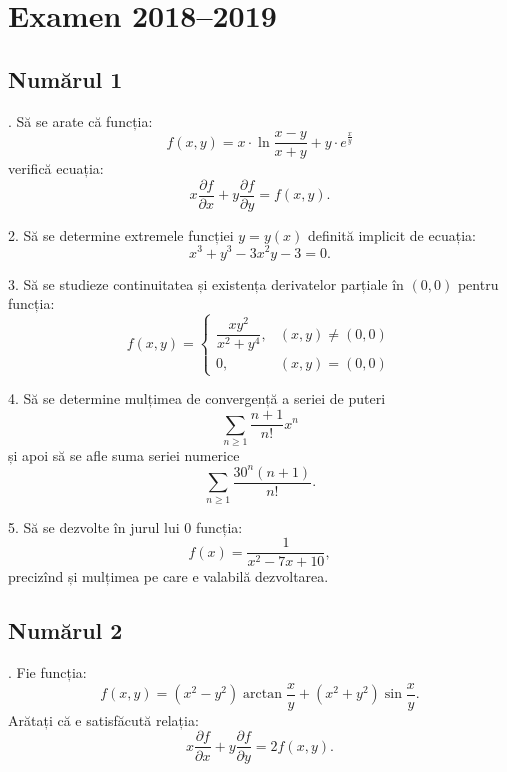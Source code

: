 
\chapter{Examen 2018--2019}

\section{Numărul 1}

\indent{}. Să se arate că funcția:
\[
  f(x, y) = x \cdot \ln \frac{x - y}{x + y} + y\cdot e^{\frac{x}{y}}
\]
verifică ecuația:
\[
  x \frac{\partial f}{\partial x} + y \frac{\partial f}{\partial y} = f(x, y).
\]

\vspace{1cm}

2. Să se determine extremele funcției $ y = y(x) $ definită implicit de
ecuația:
\[
    x^3 + y^3 - 3x^2y - 3 = 0.
\]

\vspace{1cm}

3. Să se studieze continuitatea și existența derivatelor parțiale în $(0, 0) $
pentru funcția:
\[
  f(x, y) = \begin{cases}
    \dfrac{xy^2}{x^2 + y^4}, & (x, y) \neq (0, 0) \\
    0, & (x, y) = (0, 0)
  \end{cases}
\]

\vspace{1cm}

4. Să se determine mulțimea de convergență a seriei de puteri
\[
  \sum_{n \geq 1} \dfrac{n+1}{n!} x^n
\]
și apoi să se afle suma seriei numerice
\[
  \sum_{n \geq 1} \dfrac{30^n(n + 1)}{n!}.
\]

\vspace{1cm}

5. Să se dezvolte în jurul lui $ 0 $ funcția:
\[
  f(x) = \dfrac{1}{x^2 - 7x + 10},
\]
precizînd și mulțimea pe care e valabilă dezvoltarea.


\section{Numărul 2}

\indent{}. Fie funcția:
\[
  f(x, y) = (x^2 - y^2) \arctan \dfrac{x}{y} + (x^2 + y^2) \sin \dfrac{x}{y}.
\]
Arătați că e satisfăcută relația:
\[
  x \dfrac{\partial f}{\partial x} + y \dfrac{\partial f}{\partial y} = 2 f(x, y).
\]

